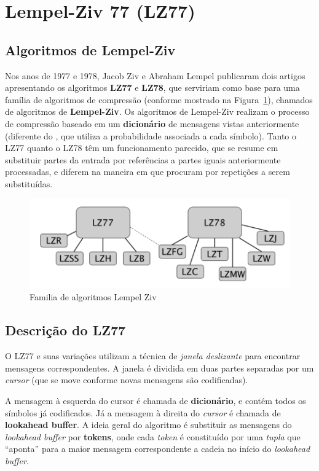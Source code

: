 \section{Lempel-Ziv 77 (LZ77)}

\subsection{Algoritmos de Lempel-Ziv}
Nos anos de 1977 e 1978, Jacob Ziv e Abraham Lempel publicaram dois artigos apresentando os algoritmos \textbf{LZ77} e \textbf{LZ78}, que serviriam como base para uma família de algoritmos de compressão (conforme mostrado na Figura~\ref{fig:lz77}), chamados de algoritmos de \textbf{Lempel-Ziv}.
Os algoritmos de Lempel-Ziv realizam o processo de compressão baseado em um \textbf{dicionário} de mensagens vistas anteriormente (diferente do , que utiliza a probabilidade associada a cada símbolo). 
Tanto o LZ77 quanto o LZ78 têm um funcionamento parecido, que se resume em substituir partes da entrada por referências a partes iguais anteriormente processadas, e diferem na maneira em que procuram por repetições a serem substituídas. 

\begin{figure}[h]
   \centering
   \includegraphics[scale=0.75]{figs/lz77fam.png}
    \caption{Familia de algoritmos Lempel Ziv}
    \label{fig:lz77}
 \end{figure}

\subsection{Descrição do LZ77}
O LZ77 e suas variações utilizam a técnica de \emph{janela deslizante} para encontrar mensagens correspondentes. 
A janela é dividida em duas partes separadas por um \emph{cursor} (que se move conforme novas mensagens são codificadas).

A mensagem à esquerda do cursor é chamada de \textbf{dicionário}, e contém todos os símbolos já codificados. Já a mensagem à direita do \emph{cursor} é chamada de \textbf{lookahead buffer}.
A ideia geral do algoritmo é substituir as mensagens do \emph{lookahead buffer} por \textbf{tokens}, onde cada \emph{token} é constituído por uma \emph{tupla} que ``aponta''  para a maior mensagem correspondente a cadeia no início do \emph{lookahead buffer}.


